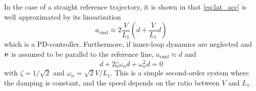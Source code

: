In the case of a straight reference trajectory, it is shown in \cite{l1_controller} that \eqref{eq:lat_acc} 
is well approximated by its linearization
\begin{equation}
    a_{\text{cmd}}\approx2\frac{V}{L_1}\left(\dot{d}+\frac{V}{L_1}d\right)
\end{equation} 
which is a PD-controller. Furthermore, if inner-loop dynamics are neglected and 
$\boldsymbol{v}$ is assumed to be parallel to the reference line, $a_{\text{cmd}}\approx \ddot{d}$ and
\begin{equation}
    \ddot{d} + 2\zeta\omega_n\dot{d} + \omega_n^2d=0
\end{equation}
with $\zeta=1/\sqrt{2}$ and $\omega_n=\sqrt{2}V/L_1$. This is a simple second-order system where 
the damping is constant, and the speed depends on the ratio between $V$ and $L_1$. 
\iffalse
\subsection{Altitude and velocity control loop}
ArduPlane uses a combined control loop to handle both desired altitude and velocity, called 
TECS (Total Energy Control System). This controller is based on the total energy of the \ac{uav},
which is defined as
\begin{equation}
    E_T=\frac{1}{2}mV^2 + mgh
\end{equation}
where $h$ is the altitude relative to the takeoff point. The total energy rate is derived
by taking the derivative with respect to time as
\begin{equation}
    \dot{E}_T=mV\dot{V} + mg\dot{h}
\end{equation}
The specific energy rate is then
\begin{equation}
    \dot{E}_S = \frac{\dot{E}_T}{mgV} = \frac{\dot{V}}{g} + \frac{\dot{h}}{V} = \frac{\dot{V}}{g} + \sin\gamma
\end{equation}
If $\gamma$ is small,
\begin{equation}
    \dot{E}_S\approx\frac{\dot{V}}{g} + \gamma
\end{equation} 
The longitudinal aircraft dynamics give
\begin{equation}
    T-D=\frac{\dot{V}}{g} + \gamma
\end{equation}
Thus, by increasing the thrust
energy is added to the system. By changing the pitch angle using the elevators, the balance 
between kinetic and potential energy can be modified. 
\fi

